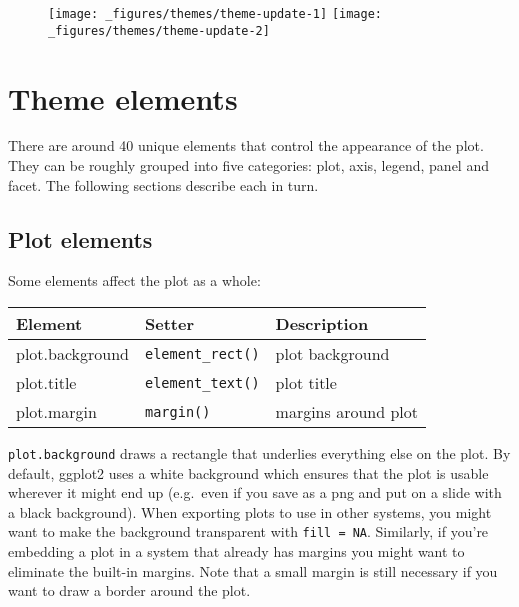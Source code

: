 \begin{figure}[H]
  \centering
  \texttt{[image: \_figures/themes/theme-update-1]}%
  \texttt{[image: \_figures/themes/theme-update-2]}
\end{figure}

\section{Theme elements}\label{sec:theme-elements}

There are around 40 unique elements that control the appearance of the
plot. They can be roughly grouped into five categories: plot, axis,
legend, panel and facet. The following sections describe each in turn.

\subsection{Plot elements}


Some elements affect the plot as a whole:

\begin{longtable}[c]{@{}lll@{}}
\toprule
Element & Setter & Description\tabularnewline
\midrule
\endhead
plot.background & \texttt{element\_rect()} & plot
background\tabularnewline
plot.title & \texttt{element\_text()} & plot title\tabularnewline
plot.margin & \texttt{margin()} & margins around plot\tabularnewline
\bottomrule
\end{longtable}

\texttt{plot.background} draws a rectangle that underlies everything
else on the plot. By default, ggplot2 uses a white background which
ensures that the plot is usable wherever it might end up (e.g.~even if
you save as a png and put on a slide with a black background). When
exporting plots to use in other systems, you might want to make the
background transparent with \texttt{fill\ =\ NA}. Similarly, if you're
embedding a plot in a system that already has margins you might want to
eliminate the built-in margins. Note that a small margin is still
necessary if you want to draw a border around the plot.

